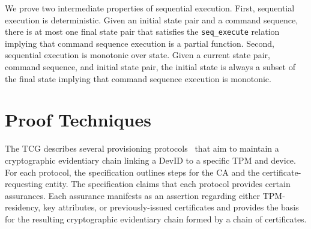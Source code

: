 \documentclass[runningheads]{llncs}
\begin{document}
We prove two intermediate properties of sequential execution. First,
sequential execution is deterministic. Given an initial state pair and
a command sequence, there is at most one final state pair that
satisfies the \verb|seq_execute| relation implying that command
sequence execution is a partial function. Second, sequential execution
is monotonic over state. Given a current state pair, command sequence,
and initial state pair, the initial state is always a subset of the
final state implying that command sequence execution is monotonic.

  

%
%
%
\section{Proof Techniques}

The TCG describes several provisioning protocols~\citep{DevIDSpec-TCG}
that aim to maintain a cryptographic evidentiary chain linking a DevID
to a specific TPM and device. For each protocol, the specification
outlines steps for the CA and the certificate-requesting entity.  The
specification claims that each protocol provides certain assurances.
Each assurance manifests as an assertion regarding either
TPM-residency, key attributes, or previously-issued certificates and
provides the basis for the resulting cryptographic evidentiary chain
formed by a chain of certificates.
\end{document}

